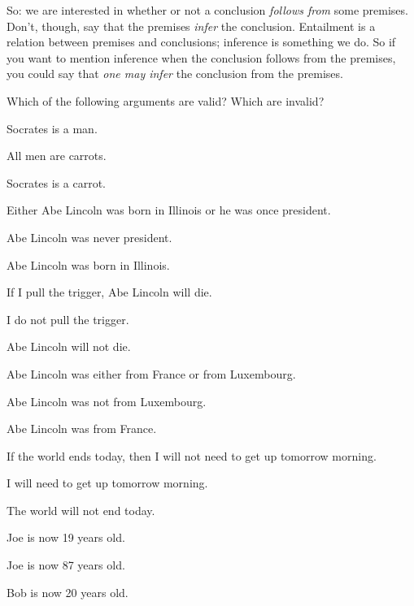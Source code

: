 So: we are interested in whether or not a conclusion \emph{follows from} some premises. Don't, though, say that the premises \emph{infer} the conclusion. Entailment is a relation between premises and conclusions; inference is something we do. So if you want to mention inference when the conclusion follows from the premises, you could say that \emph{one may infer} the conclusion from the premises.


\practiceproblems
\problempart
Which of the following arguments are valid? Which are invalid?
\begin{compactlist}
\item
\begin{earg}
\item Socrates is a man.
\item All men are carrots.
\item[\texttherefore] Socrates is a carrot.
\end{earg}
\item
\begin{earg}
\item Either Abe Lincoln was born in Illinois or he was once president.
\item Abe Lincoln was never president.
\item[\texttherefore] Abe Lincoln was born in Illinois.
\end{earg}
\item
\begin{earg}
\item If I pull the trigger, Abe Lincoln will die.
\item I do not pull the trigger.
\item[\texttherefore] Abe Lincoln will not die.
\end{earg}
\item
\begin{earg}
\item Abe Lincoln was either from France or from Luxembourg.
\item Abe Lincoln was not from Luxembourg.
\item[\texttherefore] Abe Lincoln was from France.
\end{earg}
\item
\begin{earg}
\item If the world ends today, then I will not need to get up tomorrow morning.
\item I will need to get up tomorrow morning.
\item[\texttherefore] The world will not end today.
\end{earg}
\item
\begin{earg}
\item Joe is now 19 years old.
\item Joe is now 87 years old.
\item[\texttherefore] Bob is now 20 years old.
\end{earg}
\end{compactlist}


